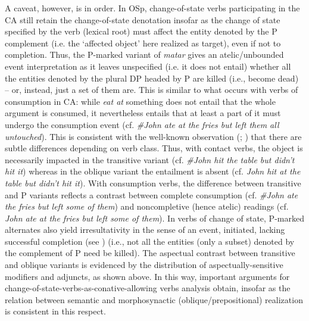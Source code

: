 \documentclass[output=paper,colorlinks,citecolor=brown,
]{langscibook}
\begin{document}
A caveat, however, is in order. In OSp, change-of-state verbs participating in the CA still retain the change-of-state denotation insofar as the change of state specified by the verb (lexical root) must affect the entity denoted by the P complement (i.e. the ‘affected object’ here realized as target), even if not to completion. Thus, the P-marked variant of \textit{matar} gives an atelic/unbounded event interpretation as it leaves unspecified (i.e. it does not entail) whether all the entities denoted by the plural DP headed by P are killed (i.e., become dead) -- or, instead, just a set of them are. This is similar to what occurs with verbs of consumption in CA: while \textit{eat at} something does not entail that the whole argument is consumed, it nevertheless entails that at least a part of it must undergo the consumption event (cf. \textit{\#John ate at the fries but left them all untouched}). This is consistent with the well-known observation (\citealt{BeaversandFrancez2006}; \citealt{Beavers2011}) that there are subtle differences depending on verb class. Thus, with contact verbs, the object is necessarily impacted in the transitive variant (cf. \textit{\#John hit the table but didn’t hit it}) whereas in the oblique variant the entailment is absent (cf. \textit{John hit at the table but didn’t hit it}). With consumption verbs, the difference between transitive and P variants reflects a contrast between complete consumption (cf. \textit{\#John ate the fries but left some of them}) and noncompletive (hence atelic) readings (cf. \textit{John ate at the fries but left some of them}). In verbs of change of state, P-marked alternates also yield irresultativity in the sense of an event, initiated, lacking successful completion (see \citealt{Vincent2013}) (i.e., not all the entities (only a subset) denoted by the complement of P need be killed). The aspectual contrast between transitive and oblique variants is evidenced by the distribution of aspectually-sensitive modifiers and adjuncts, as shown above. In this way, important arguments for change-of-state-verbs-as-conative-allowing verbs analysis obtain, insofar as the relation between semantic and morphosynactic (oblique/prepositional) realization is consistent in this respect.
\end{document}
